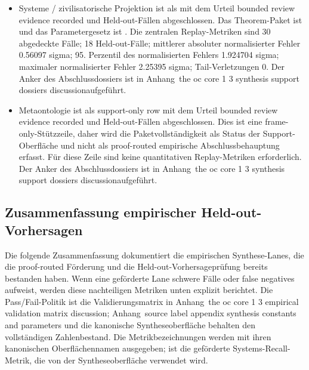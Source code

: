 \begin{itemize}[leftmargin=1.6em,nosep]
\item Systeme / zivilisatorische Projektion ist als  mit dem Urteil bounded review evidence recorded und  Held-out-Fällen abgeschlossen. Das Theorem-Paket ist  und das Parametergesetz ist . Die zentralen Replay-Metriken sind 30 abgedeckte Fälle; 18 Held-out-Fälle; mittlerer absoluter normalisierter Fehler 0.56097 sigma; 95. Perzentil des normalisierten Fehlers 1.924704 sigma; maximaler normalisierter Fehler 2.25395 sigma; Tail-Verletzungen 0. Der Anker des Abschlussdossiers ist in Anhang~the oc core 1 3 synthesis support dossiers discussionaufgeführt.
\item Metaontologie ist als support-only row mit dem Urteil bounded review evidence recorded und  Held-out-Fällen abgeschlossen. Dies ist eine frame-only-Stützzeile, daher wird die Paketvollständigkeit als Status der Support-Oberfläche und nicht als proof-routed empirische Abschlussbehauptung erfasst. Für diese Zeile sind keine quantitativen Replay-Metriken erforderlich. Der Anker des Abschlussdossiers ist in Anhang~the oc core 1 3 synthesis support dossiers discussionaufgeführt.
\end{itemize}

\subsection{Zusammenfassung empirischer Held-out-Vorhersagen}
Die folgende Zusammenfassung dokumentiert die empirischen Synthese-Lanes, die die proof-routed Förderung und die Held-out-Vorhersageprüfung bereits bestanden haben.
Wenn eine geförderte Lane schwere Fälle oder false negatives aufweist, werden diese nachteiligen Metriken unten explizit berichtet. Die Pass/Fail-Politik ist die Validierungsmatrix in Anhang~the oc core 1 3 empirical validation matrix discussion; Anhang~source label appendix synthesis constants and parameters und die kanonische Syntheseoberfläche behalten den vollständigen Zahlenbestand.
Die Metrikbezeichnungen werden mit ihren kanonischen Oberflächennamen ausgegeben;  ist die geförderte Systems-Recall-Metrik, die von der Syntheseoberfläche verwendet wird.

